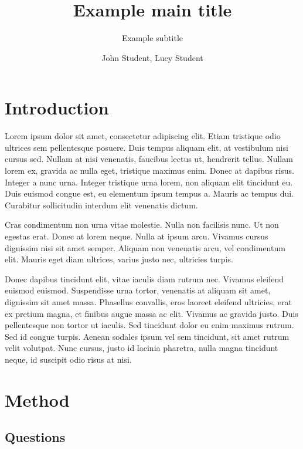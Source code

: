 \documentclass[11pt, a4paper]{resources/JTH}
\title{Example main title}
\subtitle{Example subtitle}
\author{John Student, Lucy Student}
\begin{document}
\maketitle

\tableofcontents

\newpage
{}
\section{Introduction}
\label{chap:introduction}
Lorem ipsum dolor sit amet, consectetur adipiscing elit. Etiam tristique odio ultrices sem pellentesque posuere. Duis tempus aliquam elit, at vestibulum nisi cursus sed. Nullam at nisi venenatis, faucibus lectus ut, hendrerit tellus. Nullam lorem ex, gravida ac nulla eget, tristique maximus enim. Donec at dapibus risus. Integer a nunc urna. Integer tristique urna lorem, non aliquam elit tincidunt eu. Duis euismod congue est, eu elementum ipsum tempus a. Mauris ac tempus dui. Curabitur sollicitudin interdum elit venenatis dictum. \citep{davidson1996c}

Cras condimentum non urna vitae molestie. Nulla non facilisis nunc. Ut non egestas erat. Donec at lorem neque. Nulla at ipsum arcu. Vivamus cursus dignissim nisi sit amet semper. Aliquam non venenatis arcu, vel condimentum elit. Mauris eget diam ultrices, varius justo nec, ultricies turpis. \citep{freeman2002example}

Donec dapibus tincidunt elit, vitae iaculis diam rutrum nec. Vivamus eleifend euismod euismod. Suspendisse urna tortor, venenatis at aliquam sit amet, dignissim sit amet massa. Phasellus convallis, eros laoreet eleifend ultricies, erat ex pretium magna, et finibus augue massa ac elit. Vivamus ac gravida justo. Duis pellentesque non tortor ut iaculis. Sed tincidunt dolor eu enim maximus rutrum. Sed id congue turpis. Aenean sodales ipsum vel sem tincidunt, sit amet rutrum velit volutpat. Nunc cursus, justo id lacinia pharetra, nulla magna tincidunt neque, id suscipit odio risus at nisi. \citep{zloof1977query}

\section{Method}
\label{chap:Method}

\subsection{Questions}
\end{document}
